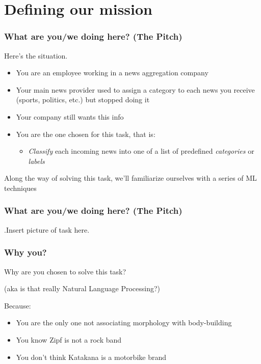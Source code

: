 \documentclass[usenames,dvipsnames]{beamer}
\newcommand{\voc}[1]{\emph{\color{ForestGreen}#1}}
\begin{document}
\section{Defining our mission}
\begin{frame}\frametitle{What are you/we doing here? (The Pitch)}
Here's the situation.
\begin{itemize}
  \item You are an employee working in a news aggregation company
 \item Your main news provider used to assign a category to each news
    you receive (sports, politics, etc.) but stopped doing it
  \item Your company still wants this info
  \item You are the one chosen for this task, that is:
  \begin{itemize}
    \item \voc{Classify} each incoming news into one of a
      list of predefined \voc{categories} or \voc{labels}
  \end{itemize}
\end{itemize}

\pause
\vspace{0.5cm}
\begin{block}{}
Along the way of solving this task, we'll familiarize
    ourselves with a series of ML techniques
\end{block}

\end{frame}


\begin{frame}\frametitle{What are you/we doing here? (The Pitch)}
.Insert picture of task here.
\end{frame}


\begin{frame}\frametitle{Why you?}
Why are you chosen to solve this task?

(aka is that really Natural Language Processing?)
\vspace{0.8cm}

Because:
\begin{itemize}
  \item You are the only one not associating morphology with body-building
  \item You know Zipf is not a rock band
  \item You don't think Katakana is a motorbike brand
\end{itemize}

\end{frame}
\end{document}
